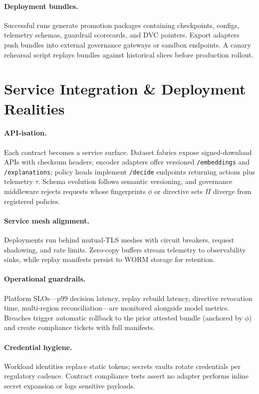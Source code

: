 \documentclass[letterpaper]{article}
\begin{document}
\paragraph{Deployment bundles.} Successful runs generate promotion packages containing checkpoints, configs, telemetry schemas, guardrail scorecards, and DVC pointers. Export adapters push bundles into external governance gateways or sandbox endpoints. A canary rehearsal script replays bundles against historical slices before production rollout.

\section{Service Integration \& Deployment Realities}
\label{sec:service}
\paragraph{API-isation.} Each contract becomes a service surface. Dataset fabrics expose signed-download APIs with checksum headers; encoder adapters offer versioned \texttt{/embeddings} and \texttt{/explanations}; policy heads implement \texttt{/decide} endpoints returning actions plus telemetry $\tau$. Schema evolution follows semantic versioning, and governance middleware rejects requests whose fingerprints $\phi$ or directive sets $\Pi$ diverge from registered policies.

\paragraph{Service mesh alignment.} Deployments run behind mutual-TLS meshes with circuit breakers, request shadowing, and rate limits. Zero-copy buffers stream telemetry to observability sinks, while replay manifests persist to WORM storage for retention.

\paragraph{Operational guardrails.} Platform SLOs---p99 decision latency, replay rebuild latency, directive revocation time, multi-region reconciliation---are monitored alongside model metrics. Breaches trigger automatic rollback to the prior attested bundle (anchored by $\phi$) and create compliance tickets with full manifests.

\paragraph{Credential hygiene.} Workload identities replace static tokens; secrets vaults rotate credentials per regulatory cadence. Contract compliance tests assert no adapter performs inline secret expansion or logs sensitive payloads.
\end{document}
